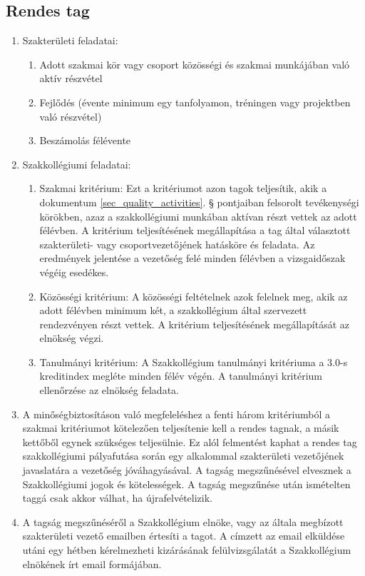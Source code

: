 \documentclass[12pt]{report}
\begin{document}
\subsection{Rendes tag} \label{subsec_quality_regular}

\begin{enumerate}
  \item Szakterületi feladatai:
  \begin{enumerate}
    \item Adott szakmai kör vagy csoport közösségi és szakmai munkájában való aktív részvétel
    \item Fejlődés (évente minimum egy tanfolyamon, tréningen vagy projektben való részvétel)
    \item Beszámolás félévente
  \end{enumerate}

  \item Szakkollégiumi feladatai: \label{enum_quality_regular}

  \begin{enumerate}
    \item Szakmai kritérium: Ezt a kritériumot azon tagok teljesítik, akik a dokumentum \ref{sec_quality_activities}. § pontjaiban felsorolt tevékenységi körökben,
      azaz a szakkollégiumi munkában aktívan részt vettek az adott félévben. A kritérium teljesítésének megállapítása a tag által választott szakterületi- vagy 
      csoportvezetőjének hatásköre és feladata. Az eredmények jelentése a vezetőség felé minden félévben a vizsgaidőszak végéig esedékes. 
    \item Közösségi kritérium: A közösségi feltételnek azok felelnek meg, akik az adott félévben minimum két, a szakkollégium által szervezett rendezvényen 
      részt vettek. A kritérium teljesítésének megállapítását az elnökség végzi.
    \item Tanulmányi kritérium: A Szakkollégium tanulmányi kritériuma a 3.0-s kreditindex megléte minden félév végén. A tanulmányi kritérium ellenőrzése az 
      elnökség feladata.
  \end{enumerate}

  \item A minőségbiztosításon való megfeleléshez a fenti három kritériumból a szakmai kritériumot kötelezően teljesítenie kell a rendes tagnak, 
    a másik kettőből egynek szükséges teljesülnie. Ez alól felmentést kaphat a rendes tag szakkollégiumi pályafutása során egy alkalommal szakterületi 
    vezetőjének javaslatára a vezetőség jóváhagyásával. A tagság megszűnésével elvesznek a Szakkollégiumi jogok és kötelességek. A tagság megszűnése után 
    ismételten taggá csak akkor válhat, ha újrafelvételizik.
  \item A tagság megszűnéséről a Szakkollégium elnöke, vagy az általa megbízott szakterületi vezető emailben értesíti a tagot. A címzett az email 
    elküldése utáni egy hétben kérelmezheti kizárásának felülvizsgálatát a Szakkollégium elnökének írt email formájában.   
\end{enumerate}
\end{document}
